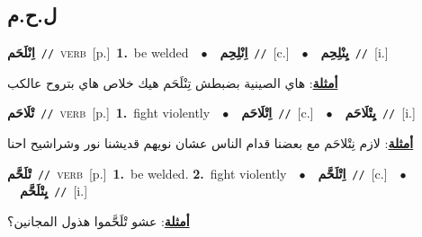 \documentclass[10pt,a4paper,twoside]{article} %
\begin{document}
\begin{multicols}{2}
\vspace{-3mm}
\subsection*{\color{blue}\foreignlanguage{arabic}{ل.ح.م}\color{blue}{}} 

{\setlength\topsep{0pt}\textbf{\foreignlanguage{arabic}{اِنْلَحَم}}\ {\color{gray}\texttt{//}\color{black}}\ \textsc{verb}\ [p.]\ \textbf{1.}~be welded\ \ $\bullet$\ \ \setlength\topsep{0pt}\textbf{\foreignlanguage{arabic}{اِنْلِحِم}}\ {\color{gray}\texttt{//}\color{black}}\ [c.]\ \ $\bullet$\ \ \setlength\topsep{0pt}\textbf{\foreignlanguage{arabic}{يِنْلِحِم}}\ {\color{gray}\texttt{//}\color{black}}\ [i.]\  \begin{flushright}\color{gray}\foreignlanguage{arabic}{\textbf{\underline{\foreignlanguage{arabic}{أمثلة}}}: هاي الصينية بضبطش تِنْلَحَم هيك خلاص هاي بتروح عالكب}\end{flushright}\color{black}} \vspace{2mm}

{\setlength\topsep{0pt}\textbf{\foreignlanguage{arabic}{تْلَاحَم}}\ {\color{gray}\texttt{//}\color{black}}\ \textsc{verb}\ [p.]\ \textbf{1.}~fight violently\ \ $\bullet$\ \ \setlength\topsep{0pt}\textbf{\foreignlanguage{arabic}{اِتْلَاحَم}}\ {\color{gray}\texttt{//}\color{black}}\ [c.]\ \ $\bullet$\ \ \setlength\topsep{0pt}\textbf{\foreignlanguage{arabic}{يِتْلَاحَم}}\ {\color{gray}\texttt{//}\color{black}}\ [i.]\  \begin{flushright}\color{gray}\foreignlanguage{arabic}{\textbf{\underline{\foreignlanguage{arabic}{أمثلة}}}: لازم نِتْلاحَم مع بعضنا قدام الناس عشان نويهم قديشنا نور وشراشيح احنا}\end{flushright}\color{black}} \vspace{2mm}

{\setlength\topsep{0pt}\textbf{\foreignlanguage{arabic}{تْلَحَّم}}\ {\color{gray}\texttt{//}\color{black}}\ \textsc{verb}\ [p.]\ \textbf{1.}~be welded.  \textbf{2.}~fight violently\ \ $\bullet$\ \ \setlength\topsep{0pt}\textbf{\foreignlanguage{arabic}{اِتْلَحَّم}}\ {\color{gray}\texttt{//}\color{black}}\ [c.]\ \ $\bullet$\ \ \setlength\topsep{0pt}\textbf{\foreignlanguage{arabic}{يِتْلَحَّم}}\ {\color{gray}\texttt{//}\color{black}}\ [i.]\  \begin{flushright}\color{gray}\foreignlanguage{arabic}{\textbf{\underline{\foreignlanguage{arabic}{أمثلة}}}: عشو تْلَحَّموا هذول المجانين؟}\end{flushright}\color{black}} \vspace{2mm}


\end{multicols}
\end{document}
